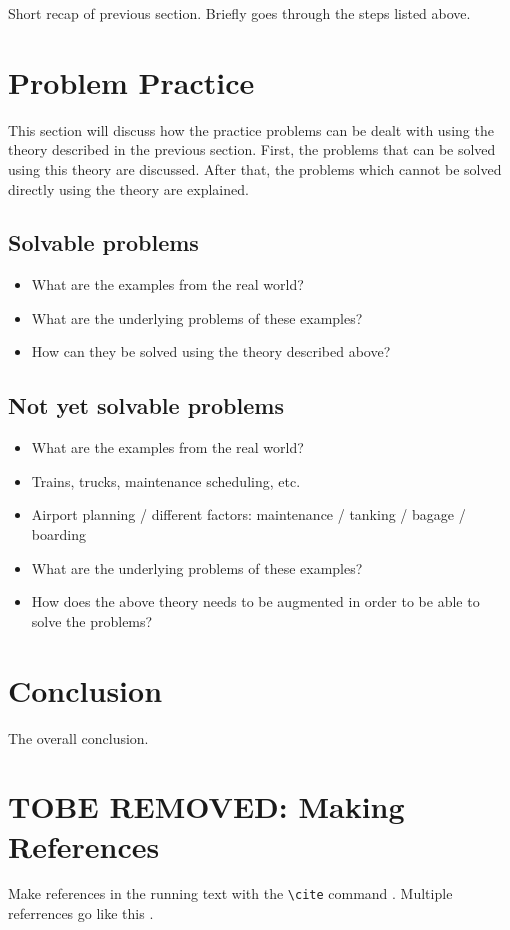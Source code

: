 \documentclass{article}
\begin{document}
Short recap of previous section. Briefly goes through the steps listed above.

\section{Problem Practice}
This section will discuss how the practice problems can be dealt with using the theory described in the previous section. First, the problems that can be solved using this theory are discussed. After that, the problems which cannot be solved directly using the theory are explained. 

\subsection{Solvable problems}
\begin{itemize}
\item What are the examples from the real world?
\item What are the underlying problems of these examples?
\item How can they be solved using the theory described above?
\end{itemize}

\subsection{Not yet solvable problems}
\begin{itemize}
\item What are the examples from the real world?
\item Trains, trucks, maintenance scheduling, etc.
\item Airport planning / different factors: maintenance / tanking / bagage / boarding
\item What are the underlying problems of these examples?
\item How does the above theory needs to be augmented in order to be able to solve the problems?
\end{itemize}

\section{Conclusion}

The overall conclusion.

\section{TOBE REMOVED: Making References}

  Make references in the running text with the \verb+\cite+
  command \cite{dijkstra68}. Multiple referrences go like this
  \cite{charniak85,steels98}.




\end{document}
